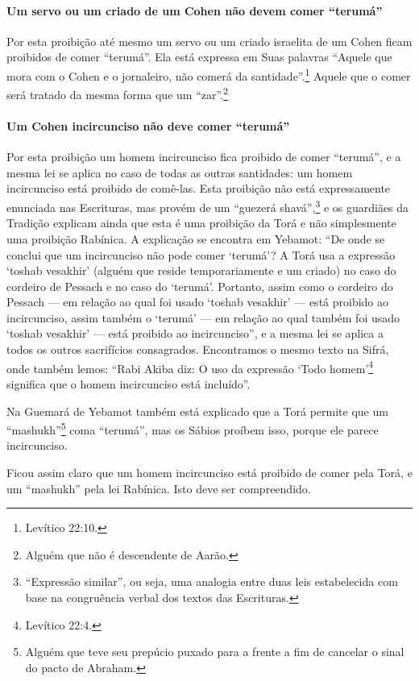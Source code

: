 \paragraph{Um servo ou um criado de um Cohen não devem comer ``terumá''}

Por esta proibição até mesmo um servo ou um criado israelita de um
Cohen ficam proibidos de comer ``terumá''. Ela está expressa em Suas
palavras ``Aquele que mora com o Cohen e o jornaleiro, não comerá da
santidade''.\footnote{Levítico 22:10.} Aquele que o comer será tratado da mesma
forma que um ``zar''.\footnote{Alguém que não é descendente de Aarão.}

\paragraph{Um Cohen incircunciso não deve comer ``terumá''}

Por esta proibição um homem incircunciso fica proibido de comer
``terumá'', e a mesma lei se aplica no caso de todas as outras santidades:
um homem incircunciso está proibido de comê-las. Esta proibição não está
expressamente enunciada nas Escrituras, mas provém de um ``guezerá
shavá'',\footnote{``Expressão similar'', ou seja, uma analogia entre duas leis
  estabelecida com base na congruência verbal dos textos das Escrituras.} e os guardiães da Tradição explicam ainda
que esta é uma proibição da Torá e não simplesmente uma proibição
Rabínica. A explicação se encontra em Yebamot: ``De onde se conclui que
um incircunciso não pode comer `terumá'? A Torá usa a expressão `toshab
vesakhir' (alguém que reside temporariamente e um criado) no caso do
cordeiro de Pessach e no caso do `terumá'. Portanto, assim como o
cordeiro do Pessach --- em relação ao qual foi usado `toshab vesakhir'
--- está proibido ao incircunciso, assim também o `terumá' --- em
relação ao qual também foi usado `toshab vesakhir' --- está proibido ao
incircunciso'', e a mesma lei se aplica a todos os outros sacrifícios
consagrados. Encontramos o mesmo texto na Sifrá, onde também lemos:
``Rabi Akiba diz: O uso da expressão `Todo homem'\footnote{Levítico 22:4.}
significa que o homem incircunciso está incluído''.

Na Guemará de Yebamot também está explicado que a Torá permite que um
``mashukh''\footnote{Alguém que teve seu prepúcio puxado para a frente a fim de cancelar o sinal do pacto de Abraham.} coma ``terumá'', mas os Sábios proíbem
isso, porque ele parece incircunciso.

Ficou assim claro que um homem incircunciso está proibido de comer pela
Torá, e um ``mashukh'' pela lei Rabínica. Isto deve ser compreendido.

